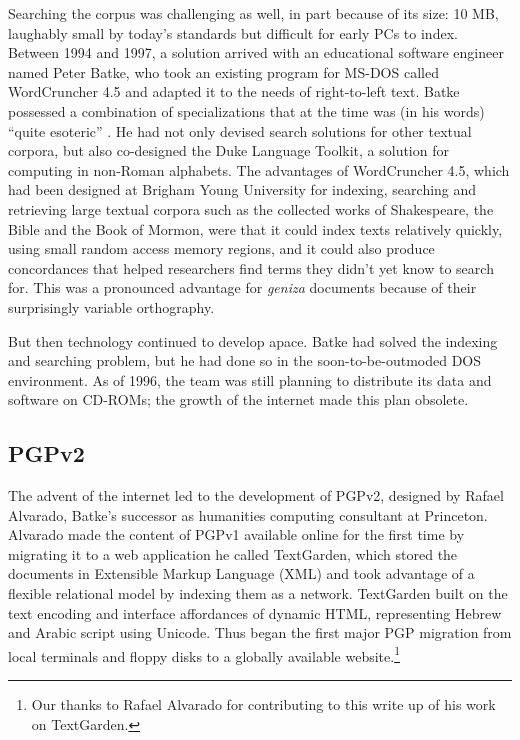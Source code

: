 \documentclass{article}
\begin{document}
Searching the corpus was challenging as well, in part because of its size: 10 MB, laughably small by today’s standards but difficult for early PCs to index. Between 1994 and 1997, a solution arrived with an educational software engineer named Peter Batke, who took an existing program for MS-DOS called WordCruncher 4.5 and adapted it to the needs of right-to-left text. Batke possessed a combination of specializations that at the time was (in his words) “quite esoteric” \autocite{noauthor_background_nodate}. He had not only devised search solutions for other textual corpora, but also co-designed the Duke Language Toolkit, a solution for computing in non-Roman alphabets. The advantages of WordCruncher 4.5, which had been designed at Brigham Young University for indexing, searching and retrieving large textual corpora such as the collected works of Shakespeare, the Bible and the Book of Mormon, were that it could index texts relatively quickly, using small random access memory regions, and it could also produce concordances that helped researchers find terms they didn’t yet know to search for. This was a pronounced advantage for \textit{geniza} documents because of their surprisingly variable orthography. 

But then technology continued to develop apace. Batke had solved the indexing and searching problem, but he had done so in the soon-to-be-outmoded DOS environment. As of 1996, the team was still planning to distribute its data and software on CD-ROMs; the growth of the internet made this plan obsolete.

\subsection{PGPv2}

The advent of the internet led to the development of PGPv2, designed by Rafael Alvarado, Batke’s successor as humanities computing consultant at Princeton. Alvarado made the content of PGPv1 available online for the first time by migrating it to a web application he called TextGarden, which stored the documents in Extensible Markup Language (XML) and took advantage of a flexible relational model by indexing them as a network. TextGarden built on the text encoding and interface affordances of dynamic HTML, representing Hebrew and Arabic script using Unicode. Thus began the first major PGP migration from local terminals and floppy disks to a globally available website.\footnote{Our thanks to Rafael Alvarado for contributing to this write up of his work on TextGarden.} 
\end{document}

